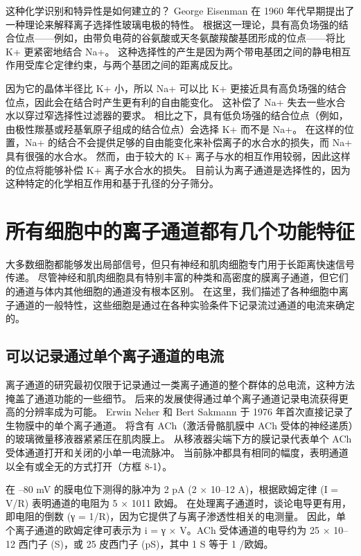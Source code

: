 这种化学识别和特异性是如何建立的？
George Eisenman 在 1960 年代早期提出了一种理论来解释离子选择性玻璃电极的特性。
根据这一理论，具有高负场强的结合位点——例如，由带负电荷的谷氨酸或天冬氨酸羧酸基团形成的位点——将比 K+ 更紧密地结合 Na+。
这种选择性的产生是因为两个带电基团之间的静电相互作用受库仑定律约束，与两个基团之间的距离成反比。


因为它的晶体半径比 K+ 小，所以 Na+ 可以比 K+ 更接近具有高负场强的结合位点，因此会在结合时产生更有利的自由能变化。
这补偿了 Na+ 失去一些水合水以穿过窄选择性过滤器的要求。
相比之下，具有低负场强的结合位点（例如，由极性羰基或羟基氧原子组成的结合位点）会选择 K+ 而不是 Na+。
在这样的位置，Na+ 的结合不会提供足够的自由能变化来补偿离子的水合水的损失，而 Na+ 具有很强的水合水。
然而，由于较大的 K+ 离子与水的相互作用较弱，因此这样的位点将能够补偿 K+ 离子水合水的损失。
目前认为离子通道是选择性的，因为这种特定的化学相互作用和基于孔径的分子筛分。



\section{所有细胞中的离子通道都有几个功能特征}

大多数细胞都能够发出局部信号，但只有神经和肌肉细胞专门用于长距离快速信号传递。
尽管神经和肌肉细胞具有特别丰富的种类和高密度的膜离子通道，但它们的通道与体内其他细胞的通道没有根本区别。
在这里，我们描述了各种细胞中离子通道的一般特性，这些细胞是通过在各种实验条件下记录流过通道的电流来确定的。



\subsection{可以记录通过单个离子通道的电流}

离子通道的研究最初仅限于记录通过一类离子通道的整个群体的总电流，这种方法掩盖了通道功能的一些细节。
后来的发展使得通过单个离子通道记录电流获得更高的分辨率成为可能。
Erwin Neher 和 Bert Sakmann 于 1976 年首次直接记录了生物膜中的单个离子通道。
将含有 ACh（激活骨骼肌膜中 ACh 受体的神经递质）的玻璃微量移液器紧紧压在肌肉膜上。
从移液器尖端下方的膜记录代表单个 ACh 受体通道打开和关闭的小单一电流脉冲。
当前脉冲都具有相同的幅度，表明通道以全有或全无的方式打开（方框 8-1）。


在 –80 mV 的膜电位下测得的脉冲为 2 pA (2 × 10–12 A)，根据欧姆定律 (I = V/R) 表明通道的电阻为 5 × 1011 欧姆。
在处理离子通道时，谈论电导更有用，即电阻的倒数 (γ = 1/R)，因为它提供了与离子渗透性相关的电测量。
因此，单个离子通道的欧姆定律可表示为 i = γ × V。ACh 受体通道的电导约为 25 × 10–12 西门子 (S)，或 25 皮西门子 (pS)，其中 1 S 等于 1 /欧姆。



